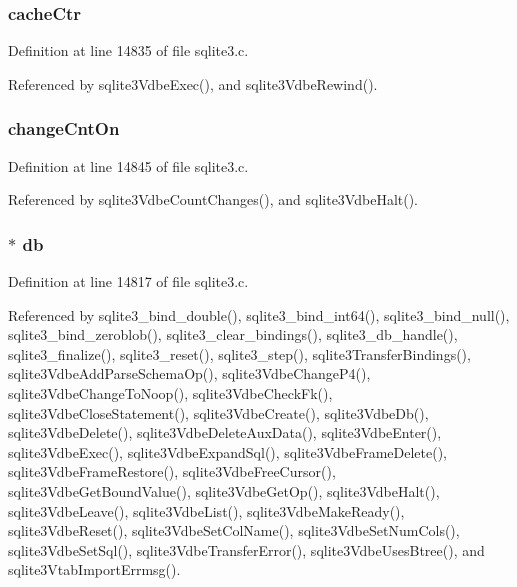 \hypertarget{struct_vdbe_a44ab771806efd27abbef48af6b1d205f}{}
\subsubsection[{cache\+Ctr}]{ cache\+Ctr}\label{struct_vdbe_a44ab771806efd27abbef48af6b1d205f}


Definition at line 14835 of file sqlite3.\+c.



Referenced by sqlite3\+Vdbe\+Exec(), and sqlite3\+Vdbe\+Rewind().

\hypertarget{struct_vdbe_a3c8419e4568fd3ba4e90ba3b1a4acae3}{}
\subsubsection[{change\+Cnt\+On}]{ change\+Cnt\+On}\label{struct_vdbe_a3c8419e4568fd3ba4e90ba3b1a4acae3}


Definition at line 14845 of file sqlite3.\+c.



Referenced by sqlite3\+Vdbe\+Count\+Changes(), and sqlite3\+Vdbe\+Halt().

\hypertarget{struct_vdbe_ad6e663497d2c934364b3bcf07496b30b}{}
\subsubsection[{db}]{$\ast$ db}\label{struct_vdbe_ad6e663497d2c934364b3bcf07496b30b}


Definition at line 14817 of file sqlite3.\+c.



Referenced by sqlite3\+\_\+bind\+\_\+double(), sqlite3\+\_\+bind\+\_\+int64(), sqlite3\+\_\+bind\+\_\+null(), sqlite3\+\_\+bind\+\_\+zeroblob(), sqlite3\+\_\+clear\+\_\+bindings(), sqlite3\+\_\+db\+\_\+handle(), sqlite3\+\_\+finalize(), sqlite3\+\_\+reset(), sqlite3\+\_\+step(), sqlite3\+Transfer\+Bindings(), sqlite3\+Vdbe\+Add\+Parse\+Schema\+Op(), sqlite3\+Vdbe\+Change\+P4(), sqlite3\+Vdbe\+Change\+To\+Noop(), sqlite3\+Vdbe\+Check\+Fk(), sqlite3\+Vdbe\+Close\+Statement(), sqlite3\+Vdbe\+Create(), sqlite3\+Vdbe\+Db(), sqlite3\+Vdbe\+Delete(), sqlite3\+Vdbe\+Delete\+Aux\+Data(), sqlite3\+Vdbe\+Enter(), sqlite3\+Vdbe\+Exec(), sqlite3\+Vdbe\+Expand\+Sql(), sqlite3\+Vdbe\+Frame\+Delete(), sqlite3\+Vdbe\+Frame\+Restore(), sqlite3\+Vdbe\+Free\+Cursor(), sqlite3\+Vdbe\+Get\+Bound\+Value(), sqlite3\+Vdbe\+Get\+Op(), sqlite3\+Vdbe\+Halt(), sqlite3\+Vdbe\+Leave(), sqlite3\+Vdbe\+List(), sqlite3\+Vdbe\+Make\+Ready(), sqlite3\+Vdbe\+Reset(), sqlite3\+Vdbe\+Set\+Col\+Name(), sqlite3\+Vdbe\+Set\+Num\+Cols(), sqlite3\+Vdbe\+Set\+Sql(), sqlite3\+Vdbe\+Transfer\+Error(), sqlite3\+Vdbe\+Uses\+Btree(), and sqlite3\+Vtab\+Import\+Errmsg().

